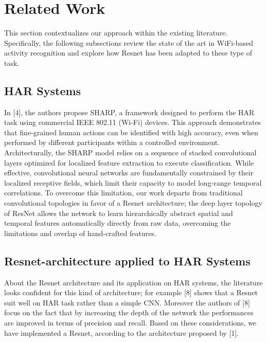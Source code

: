 \section{Related Work}
\label{sec:related_work}

This section contextualizes our approach within the existing literature. Specifically, the following subsections review the state of the art in WiFi-based activity recognition and explore how Resnet has been adapted to these type of task.

\subsection{HAR Systems}
In [4], the authors propose SHARP, a framework designed to perform the HAR task using commercial IEEE 802.11 (Wi-Fi) devices. This approach demonstrates that fine-grained human actions can be identified with high accuracy, even when performed by different participants within a controlled environment. Architecturally, the SHARP model relies on a sequence of stacked convolutional layers optimized for localized feature extraction to execute classification. While effective, convolutional neural networks are fundamentally constrained by their localized receptive fields, which limit their capacity to model long-range temporal correlations. To overcome this limitation, our work departs from traditional convolutional topologies in favor of a Resnet architecture; the deep layer topology of ResNet allows the network to learn hierarchically abstract spatial and temporal features automatically directly from raw data, overcoming the limitations and overlap of hand-crafted features.

\subsection{Resnet-architecture applied to HAR Systems}
About the Resnet architecture and its application on HAR systems, the literature looks confident for this kind of architecture; for example [8] shows that a Resnet suit well on HAR task rather than a simple CNN. Moreover the authors of [8] focus on the fact that by increasing the depth of the network the performances are improved in terms of precision and recall. Based on these considerations, we have implemented a Resnet, according to the architecture proposed by [1].